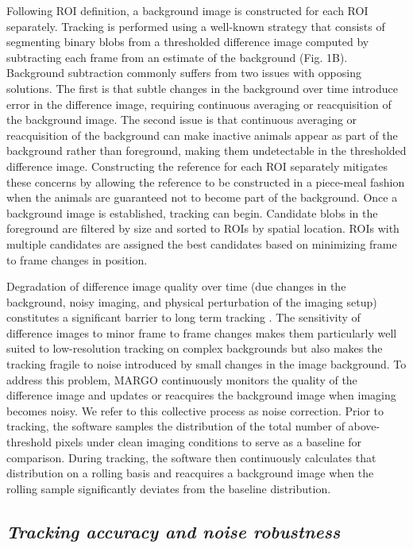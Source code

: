 \documentclass[10pt]{article}
\begin{document}
\begin{multicols}{2}
Following ROI definition, a background image is constructed for each ROI separately. Tracking is performed using a well-known strategy that consists of segmenting binary blobs from a thresholded difference image computed by subtracting each frame from an estimate of the background (Fig. 1B). Background subtraction commonly suffers from two issues with opposing solutions. The first is that subtle changes in the background over time introduce error in the difference image, requiring continuous averaging or reacquisition of the background image. The second issue is that continuous averaging or reacquisition of the background can make inactive animals appear as part of the background rather than foreground, making them undetectable in the thresholded difference image. Constructing the reference for each ROI separately mitigates these concerns by allowing the reference to be constructed in a piece-meal fashion when the animals are guaranteed not to become part of the background. Once a background image is established, tracking can begin. Candidate blobs in the foreground are filtered by size and sorted to ROIs by spatial location. ROIs with multiple candidates are assigned the best candidates based on minimizing frame to frame changes in position.

Degradation of difference image quality over time (due changes in the background, noisy imaging, and physical perturbation of the imaging setup) constitutes a significant barrier to long term tracking \cite{Sridhar_Tracktor_2018}. The sensitivity of difference images to minor frame to frame changes makes them particularly well suited to low-resolution tracking on complex backgrounds \cite{Liu_A_2018} but also makes the tracking fragile to noise introduced by small changes in the image background. To address this problem, MARGO continuously monitors the quality of the difference image and updates or reacquires the background image when imaging becomes noisy. We refer to this collective process as noise correction. Prior to tracking, the software samples the distribution of the total number of above-threshold pixels under clean imaging conditions to serve as a baseline for comparison.  During tracking, the software then continuously calculates that distribution on a rolling basis and reacquires a background image when the rolling sample significantly deviates from the baseline distribution.

\subsection*{\textit{Tracking accuracy and noise robustness}}


\end{multicols}
\end{document}
